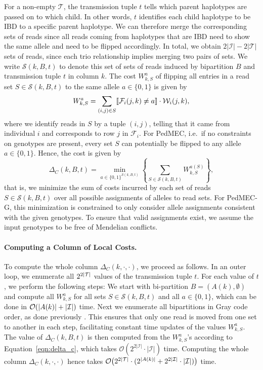 For a non-empty $\mathcal{T}$, the transmission tuple $t$ tells which parent haplotypes are passed on to which child.
In other words, $t$ identifies each child haplotype to be IBD to a specific parent haplotype.
We can therefore merge the corresponding sets of reads since all reads coming from haplotypes that are IBD need to show the same allele and need to be flipped accordingly.
In total, we obtain $2|\mathcal{I}| - 2|\mathcal{T}|$ sets of reads, since each trio relationship implies merging two pairs of sets.
We write $\mathcal{S}(k,B,t)$ to denote this set of sets of reads induced by bipartition $B$ and transmission tuple $t$ in column $k$.
The cost $W_{k,S}^a$ of flipping all entries in a read set $S\in \mathcal{S}(k,B,t)$ to the same allele $a\in\{0,1\}$ is given by 
\[W_{k,S}^a = \sum_{(i,j)\in S}\llbracket \mathcal{F}_i(j,k)\neq a\rrbracket\cdot\mathcal{W}_i(j,k),\]
where we identify reads in $S$ by a tuple $(i,j)$, telling that it came from individual $i$ and corresponds to row $j$ in $\mathcal{F}_i$.
For PedMEC, i.e.\ if no constraints on genotypes are present, every set $S$ can potentially be flipped to any allele $a\in\{0,1\}$.
Hence, the cost is given by 
\begin{equation}\label{eqn:delta_c}
\Delta_C(k,B,t)= \min_{a\in \{0,1\}^{\mathcal{S}(k,B,t)}}\left\{\sum_{S\in\mathcal{S}(k,B,t)}W_{k,S}^{a(S)}\right\},
\end{equation}
that is, we minimize the sum of costs incurred by each set of reads $S\in\mathcal{S}(k,B,t)$ over all possible assignments of alleles to read sets.
For PedMEC-G, this minimization is constrained to only consider allele assignments consistent with the given genotypes.
To ensure that valid assignments exist, we assume the input genotypes to be free of Mendelian conflicts.

\paragraph{Computing a Column of Local Costs.}
To compute the whole column $\Delta_C(k,\cdot,\cdot)$, we proceed as follows.
In an outer loop, we enumerate all $2^{2{\left\lvert \mathcal{T} \right\rvert}}$ values of the transmission tuple $t$.
For each value of $t$, we perform the following steps:
We start with bi-partition $B=(A(k),\emptyset)$ and compute all $W_{k,S}^a$ for all sets $S\in\mathcal{S}(k,B,t)$ and all $a\in\{0,1\}$, which can be done in $\mathcal{O}({\left\lvert A(k) \right\rvert}+|\mathcal{I}|)$ time.
Next we enumerate all bipartitions in Gray code order, as done previously \citep{Patterson2015}.
This ensures that only one read is moved from one set to another in each step, facilitating constant time updates of the values $W_{k,S}^a$.
The value of $\Delta_C(k,B,t)$ is then computed from the $W_{k,S}^a$'s according to Equation~\eqref{eqn:delta_c}, which takes $\mathcal{O}(2^{2|\mathcal{I}|}\cdot |\mathcal{I}|)$ time.
Computing the whole column $\Delta_C(k,\cdot,\cdot)$ hence takes 
$\mathcal{O}\big(2^{2{\left\lvert \mathcal{T} \right\rvert}}\cdot(2^{|A(k)|} +  2^{2|\mathcal{I}|}\cdot |\mathcal{I}|)\big)$
time.

